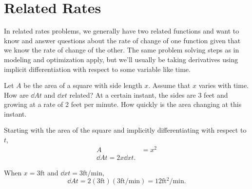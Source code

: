 \section{Related Rates}
In related rates problems, we generally have two related functions and want to know and answer questions about the rate of change of one function given that we know the rate of change of the other. The same problem solving steps as in modeling and optimization apply, but we'll usually be taking derivatives using implicit differentiation with respect to some variable like time.

\begin{example}
	Let $A$ be the area of a square with side length $x$.
	Assume that $x$ varies with time.
	How are $\dd{A}{t}$ and $\dd{x}{t}$ related?
	At a certain instant, the sides are 3 feet and growing at a rate of 2 feet per minute.
	How quickly is the area changing at this instant.
\end{example}
\begin{answer}
	Starting with the area of the square and implicitly differentiating with respect to $t$,
	\begin{align*}
		A &= x^2 \\
		\dd{A}{t} = 2x\dd{x}{t}.
	\end{align*}
	
	When $x=3\text{ft}$ and $\dd{x}{t}=3\text{ft/min}$,
	\begin{equation*}
		\dd{A}{t} = 2(3\text{ft})(3\text{ft/min}) = 12\text{ft$^2$/min}.
	\end{equation*}
\end{answer}


